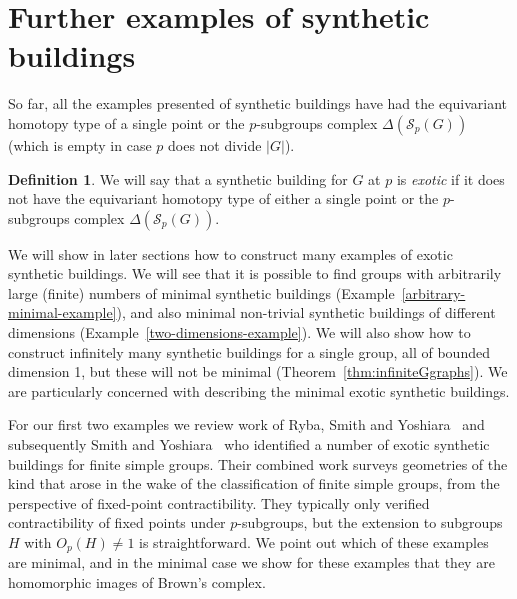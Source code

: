 \documentclass[12pt]{amsart}
\theoremstyle{plain}
\theoremstyle{definition}
\newtheorem{definition}[theorem]{Definition}
\theoremstyle{remark}
\numberwithin{equation}{section}
\newcommand{\SpCpx}[2]{\Delta(\mathcal{S}_{#2}(#1))}
\begin{document}
\section{Further examples of synthetic buildings}

So far, all the examples presented of synthetic buildings have had the equivariant homotopy type of a single point or the $p$-subgroups complex $\SpCpx{G}{p}$ (which is empty in case $p$ does not divide $|G|$).

\begin{definition}
    We will say that a synthetic building for $G$ at $p$ is \textit{exotic} if it does not have the equivariant homotopy type of either a single point or the $p$-subgroups complex $\SpCpx{G}{p}$.
\end{definition}

We will show in later sections how to construct many examples of exotic synthetic buildings. We will see that it is possible to find groups with arbitrarily large (finite) numbers of minimal synthetic buildings (Example~\ref{arbitrary-minimal-example}), and also minimal non-trivial synthetic buildings of different dimensions (Example~\ref{two-dimensions-example}). We will also show how to construct infinitely many synthetic buildings for a single group, all of bounded dimension 1, but these will not be minimal (Theorem~\ref{thm:infiniteGgraphs}). We are particularly concerned with describing the minimal exotic synthetic buildings.

For our first two examples we review work of 
Ryba, Smith and Yoshiara~\cite{Ryb1990} and subsequently Smith and Yoshiara~\cite{Smi1997} who identified a number of exotic synthetic buildings for finite simple groups. 
    Their combined work surveys geometries of the kind that arose in the wake of the classification of finite simple groups, from the perspective of fixed-point contractibility. They typically only verified contractibility of fixed points under $p$-subgroups, but the extension to subgroups $H$ with $O_p(H)\ne 1$ is straightforward. We point out which of these examples are minimal, and in the minimal case we show for these examples that they are homomorphic images of Brown's complex.
\end{document}
